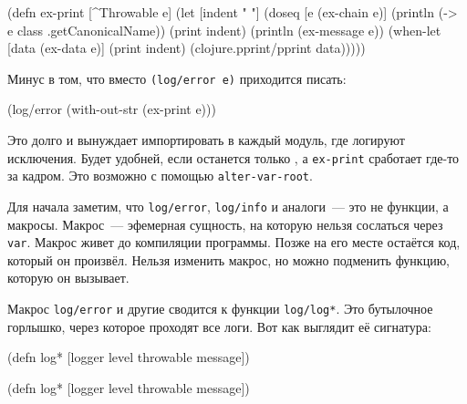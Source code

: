 \else

\begin{english}
  \begin{clojure}
(defn ex-print
  [^Throwable e]
  (let [indent "  "]
    (doseq [e (ex-chain e)]
      (println (-> e class .getCanonicalName))
      (print indent)
      (println (ex-message e))
      (when-let [data (ex-data e)]
        (print indent)
        (clojure.pprint/pprint data)))))
  \end{clojure}
\end{english}

\fi

\noindent
Минус в том, что вместо \verb|(log/error e)| приходится писать:

\begin{english}
  \begin{clojure}
(log/error (with-out-str (ex-print e)))
  \end{clojure}
\end{english}

Это долго и вынуждает импортировать  в каждый модуль, где логируют
исключения. Будет удобней, если останется только , а
\verb|ex-print| сработает где-то за кадром. Это возможно с помощью
\texttt{alter-var\--root}.

Для начала заметим, что \verb|log/error|, \verb|log/info| и аналоги~--- это не
функции, а макросы. Макрос~--- эфемерная сущность, на которую нельзя сослаться
через \verb|var|. Макрос живет до компиляции программы. Позже на его месте
остаётся код, который он произвёл. Нельзя изменить макрос, но можно подменить
функцию, которую он вызывает.


Макрос \verb|log/error| и другие сводится к функции \verb|log/log*|. Это
бутылочное горлышко, через которое проходят все логи. Вот как выглядит её
сигнатура:

\ifnarrow

\begin{english}
  \begin{clojure}
(defn log*
  [logger level throwable message])
  \end{clojure}
\end{english}

\else

\begin{english}
  \begin{clojure}
(defn log* [logger level throwable message])
  \end{clojure}
\end{english}

